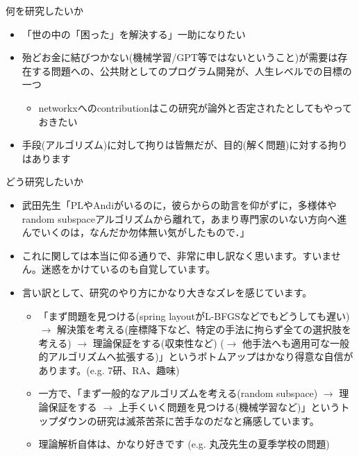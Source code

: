 \documentclass[13pt,aspectratio=169,table,dvipdfmx]{beamer}
\begin{document}
\begin{frame}{\LARGE{何を研究したいか}}
\begin{itemize}
\begin{itemize}
                      \item 「世の中の「困った」を解決する」一助になりたい
                      \item 殆どお金に結びつかない(機械学習/GPT等ではないということ)が需要は存在する問題への、公共財としてのプログラム開発が、人生レベルでの目標の一つ
                            \begin{itemize}
                                \item networkxへのcontributionはこの研究が論外と否定されたとしてもやっておきたい
                            \end{itemize}
                      \item 手段(アルゴリズム)に対して拘りは皆無だが、目的(解く問題)に対する拘りはあります
                  \end{itemize}
        \end{itemize}
    \end{frame}
    \begin{frame}{\LARGE{どう研究したいか}}
        \begin{itemize}
            \item 武田先生「PLやAndiがいるのに，彼らからの助言を仰がずに，多様体やrandom subspaceアルゴリズムから離れて，あまり専門家のいない方向へ進んでいくのは，なんだか勿体無い気がしたもので．」
            \item これに関しては本当に仰る通りで、非常に申し訳なく思います。すいません。迷惑をかけているのも自覚しています。
            \item 言い訳として、研究のやり方にかなり大きなズレを感じています。
                  \begin{itemize}
                      \item 「まず問題を見つける(spring layoutがL-BFGSなどでもどうしても遅い) $\to$ 解決策を考える(座標降下など、特定の手法に拘らず全ての選択肢を考える) $\to$ 理論保証をする(収束性など) ($\to$ 他手法へも適用可な一般的アルゴリズムへ拡張する)」というボトムアップはかなり得意な自信があります。(e.g. 7研、RA、趣味)
                      \item 一方で、「まず一般的なアルゴリズムを考える(random subspace) $\to$ 理論保証をする $\to$ 上手くいく問題を見つける(機械学習など)」というトップダウンの研究は滅茶苦茶に苦手なのだなと痛感しています。
                      \item 理論解析自体は、かなり好きです (e.g. 丸茂先生の夏季学校の問題)
                  \end{itemize}
        \end{itemize}
    \end{frame}
\end{document}

